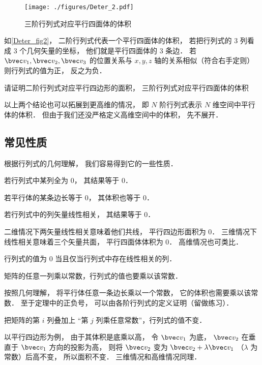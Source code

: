 \begin{figure}[ht]
\centering
\texttt{[image: ./figures/Deter\_2.pdf]}
\caption{三阶行列式对应平行四面体的体积} \label{Deter_fig2}
\end{figure}
如\autoref{Deter_fig2}， 二阶行列式代表一个平行四面体的体积， 若把行列式的 3 列看成 3 个几何矢量的坐标， 他们就是平行四面体的 3 条边． 若 $\bvec v_1, \bvec v_2, \bvec v_3$ 的位置关系与 $x, y, z$ 轴的关系相似（符合右手定则） 则行列式的值为正， 反之为负．

\begin{exercise}{}
请证明二阶行列式对应平行四边形的面积， 三阶行列式对应平行四面体的体积
\end{exercise}

以上两个结论也可以拓展到更高维的情况， 即 $N$ 阶行列式表示 $N$ 维空间中平行体的体积． 但由于我们还没严格定义高维空间中的体积， 先不展开．

\subsection{常见性质}
根据行列式的几何理解， 我们容易得到它的一些性质．

\begin{theorem}{ } \label{Deter_the1}
若行列式中某列全为 0， 其结果等于 0．
\end{theorem}
若平行体的某条边长等于 0， 其体积也等于 0．

\begin{theorem}{ }
若行列式中的列矢量线性相关， 其结果等于 0．
\end{theorem}
二维情况下两矢量线性相关意味着他们共线， 平行四边形面积为 0． 三维情况下线性相关意味着三个矢量共面， 平行四面体体积为 0． 高维情况也可类比．

\begin{theorem}{ } \label{Deter_the2}
行列式的值为 0 当且仅当行列式中存在线性相关的列．
\end{theorem}

\begin{theorem}{ } \label{Deter_the3}
矩阵的任意一列乘以常数，行列式的值也要乘以该常数．
\end{theorem}
按照几何理解， 将平行体任意一条边长乘以一个常数， 它的体积也需要乘以该常数． 至于定理中的正负号， 可以由各阶行列式的定义证明（留做练习）．

\begin{theorem}{ }
把矩阵的第 $i$ 列叠加上 “第 $j$ 列乘任意常数”，行列式的值不变．
\end{theorem}
以平行四边形为例， 由于其体积是底乘以高， 令 $\bvec v_1$ 为底， $\bvec v_2$ 在垂直于 $\bvec v_1$ 方向的投影为高， 则将 $\bvec v_2$ 变为 $\bvec v_2 + \lambda \bvec v_1$ （$\lambda$ 为常数）后高不变， 所以面积不变． 三维情况和高维情况同理．

